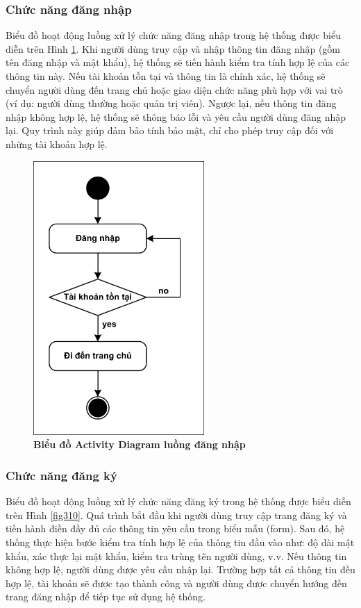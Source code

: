 \documentclass{article}
\begin{document}
	\subsubsection{Chức năng đăng nhập}
	
	Biểu đồ hoạt động luồng xử lý chức năng đăng nhập trong hệ thống được biểu diễn trên Hình \ref{fig39}. Khi người dùng truy cập và nhập thông tin đăng nhập (gồm tên đăng nhập và mật khẩu), hệ thống sẽ tiến hành kiểm tra tính hợp lệ của các thông tin này. Nếu tài khoản tồn tại và thông tin là chính xác, hệ thống sẽ chuyển người dùng đến trang chủ hoặc giao diện chức năng phù hợp với vai trò (ví dụ: người dùng thường hoặc quản trị viên). Ngược lại, nếu thông tin đăng nhập không hợp lệ, hệ thống sẽ thông báo lỗi và yêu cầu người dùng đăng nhập lại. Quy trình này giúp đảm bảo tính bảo mật, chỉ cho phép truy cập đối với những tài khoản hợp lệ.
	
	\begin{figure}[!ht]
		\centering
		\includegraphics[trim= 10pt 10pt 10pt 10pt, clip, width=6.5cm]{activity_fig39.pdf}
		\caption [Biểu đồ Activity Diagram luồng đăng nhập]{\bfseries \fontsize{12pt}{0pt}\selectfont Biểu đồ Activity Diagram luồng đăng nhập}
		\label{fig39}
	\end{figure}
	
	\subsubsection{Chức năng đăng ký}
	
	Biểu đồ hoạt động luồng xử lý chức năng đăng ký trong hệ thống được biểu diễn trên Hình \ref{fig310}. Quá trình bắt đầu khi người dùng truy cập trang đăng ký và tiến hành điền đầy đủ các thông tin yêu cầu trong biểu mẫu (form). Sau đó, hệ thống thực hiện bước kiểm tra tính hợp lệ của thông tin đầu vào như: độ dài mật khẩu, xác thực lại mật khẩu, kiểm tra trùng tên người dùng, v.v. Nếu thông tin không hợp lệ, người dùng được yêu cầu nhập lại. Trường hợp tất cả thông tin đều hợp lệ, tài khoản sẽ được tạo thành công và người dùng được chuyển hướng đến trang đăng nhập để tiếp tục sử dụng hệ thống. 
	
\end{document}
